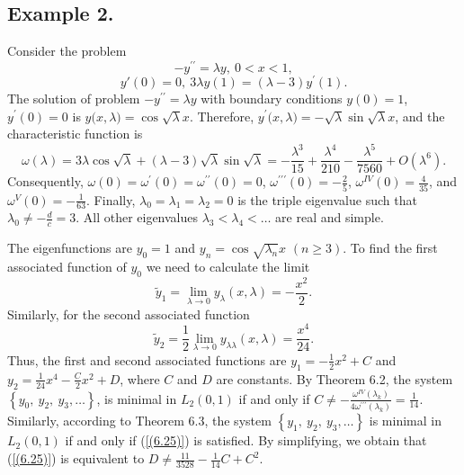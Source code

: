 \documentclass[10pt,a4paper]{amsart}
\numberwithin{equation}{section}
\begin{document}
\subsection*{Example 2.}Consider the problem  
$$
-y^{\prime \prime }=\lambda y,\ 0<x<1,
$$
$$
y'(0)=0,\ 
3{\lambda}y(1)=\left( {\lambda }-3\right)y^{\prime }(1).
$$
The solution of problem $-y^{\prime \prime }=\lambda y$ with boundary conditions $y(0)=1$, $y^\prime(0)=0$ is $y({x,\lambda)}=\cos{\sqrt{\lambda}x}$. Therefore, $y^\prime({x,\lambda)}=-\sqrt{\lambda}\sin{\sqrt{\lambda}x}$, and
the characteristic function is \[\omega(\lambda) = 3\lambda\cos{\sqrt{\lambda}}+  (\lambda - 3)\sqrt{\lambda}\sin{\sqrt{\lambda}}=-\frac{\lambda^{3}}{15}+\frac{\lambda^{4}}{210}-\frac{\lambda^{5}}{7560}+O(\lambda^{6}).\]
Consequently, $\omega(0)=\omega^\prime(0)=\omega^{\prime\prime}(0)=0$, $\omega^{\prime\prime\prime}(0)=-\frac{2}{5}$, $\omega^{IV}(0)=\frac{4}{35}$, and $\omega^{V}(0)=-\frac{1}{63}$.
Finally, $\lambda _{0}=\lambda _{1}=\lambda _{2}=0$ is the triple eigenvalue such that $\lambda _{0}\neq-\frac{d}{c}=3$. All other eigenvalues $\lambda _{3}<\lambda _{4}<\ldots$ are real and simple.

The eigenfunctions are $y_{0}=1$ and $y_{n}=\cos{\sqrt{\lambda _{n}}x}$ $(n\ge 3)$.
To find the first associated function of $y_{0}$ we need to calculate the limit
$$\tilde{y}_1=\lim_{\lambda\to 0}y_\lambda(x,\lambda)=-\frac{x^2}{2}.$$
Similarly, for the second associated function
$$\tilde{y}_2=\frac{1}{2}\lim_{\lambda\to 0}y_{\lambda\lambda}(x,\lambda)=\frac{x^4}{24}.$$
Thus, the first and second associated functions are $y_{1}=-\frac{1}{2}x^2+C$ and $y_{2}=\frac{1}{24}x^4-\frac{C}{2}x^2+D$, where $C$ and $D$ are constants. By Theorem 6.2,
the system $\left\{ y_{0},\ y_{2},\ y_{3},\ldots\right\}$, is minimal in $L_2(0,1)$ if and only if $C\neq-\frac{\omega^{IV}(\lambda_k)}{4\omega^{\prime\prime\prime}(\lambda_k)}=\frac{1}{14}$. 
Similarly, according to Theorem 6.3,
the system $\left\{ y_{1},\ y_{2},\ y_{3},\ldots\right\}$ is minimal in $L_2(0,1)$ if and only if (\ref{(6.25)}) is satisfied. By simplifying, we obtain that (\ref{(6.25)}) is equivalent to $D\ne\frac{11}{3528}-\frac{1}{14} C+C^{2}$.
\end{document}
